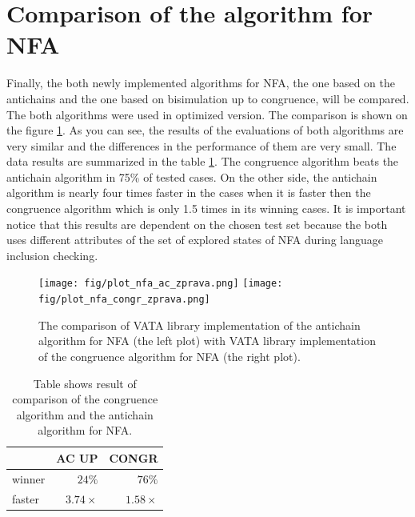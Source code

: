 \section{Comparison of the algorithm for NFA}
Finally, the both newly implemented algorithms for NFA, the one based on the antichains and the one based on bisimulation up to congruence, will be compared.
The both algorithms were used in optimized version.
The comparison is shown on the figure \ref{fig:figPlotNFA}.
As you can see, the results of the evaluations of both algorithms are very similar and the differences in the performance of
them are very small. 
The data results are summarized in the table \ref{tabNFA}. The congruence algorithm beats the antichain algorithm in 75\% of
tested cases. On the other side, the antichain algorithm is nearly four times faster in the cases when it is faster then the congruence algorithm which is
only 1.5 times in its winning cases. It is important notice that this results are dependent on the chosen test set because the both uses different attributes
of the set of explored states of NFA during language inclusion checking.

\begin{figure}[bt]
\begin{center}
\texttt{[image: fig/plot\_nfa\_ac\_zprava.png]}
\texttt{[image: fig/plot\_nfa\_congr\_zprava.png]}
\caption{The comparison of VATA library implementation of the antichain algorithm for NFA (the left plot)
    with VATA library implementation of the congruence algorithm for NFA (the right plot).}
\label{fig:figPlotNFA}
\end{center}
\end{figure}

\begin{table}[bt]
\begin{center}
\parbox{.45\linewidth}{
  \begin{tabular}[scale=0.3]{ | l | r | r |}
   \hline
    & \textbf{AC UP} & \textbf{CONGR} \\ \hline \hline
    winner & $24\%$ & $76\%$ \\ \hline
    faster & $3.74\times$ & $1.58\times$ \\ \hline
   \end{tabular}
}
   \caption{Table shows result of comparison of the congruence algorithm and the antichain algorithm for NFA.}
   \label{tabNFA}
\end{center}
\end{table}

